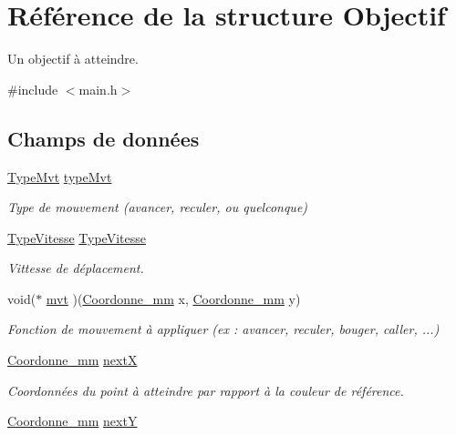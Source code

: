 \hypertarget{struct_objectif}{\section{Référence de la structure Objectif}
\label{struct_objectif}
}


Un objectif à atteindre.  




{\ttfamily \#include $<$main.\+h$>$}

\subsection*{Champs de données}
\begin{DoxyCompactItemize}
\item 
\hyperlink{main_8h_a56ce322c42cf3d49f192527547fa66e8}{Type\+Mvt} \hyperlink{struct_objectif_a4218bcb4ee981dd69d5bfd59ab0804e2}{type\+Mvt}
\begin{DoxyCompactList}\small\item\em Type de mouvement (avancer, reculer, ou quelconque) \end{DoxyCompactList}\item 
\hyperlink{main_8h_a521a835d7ce483bf46cb72d6466e5df1}{Type\+Vitesse} \hyperlink{struct_objectif_acbd7353e97f08e474866c500e2439203}{Type\+Vitesse}
\begin{DoxyCompactList}\small\item\em Vittesse de déplacement. \end{DoxyCompactList}\item 
void($\ast$ \hyperlink{struct_objectif_abcc900b2a2f79b8ba4e543540e48378b}{mvt} )(\hyperlink{main_8h_abff5a495dd3bf48b57d041dce0cf6e68}{Coordonne\+\_\+mm} x, \hyperlink{main_8h_abff5a495dd3bf48b57d041dce0cf6e68}{Coordonne\+\_\+mm} y)
\begin{DoxyCompactList}\small\item\em Fonction de mouvement à appliquer (ex \+: avancer, reculer, bouger, caller, ...) \end{DoxyCompactList}\item 
\hyperlink{main_8h_abff5a495dd3bf48b57d041dce0cf6e68}{Coordonne\+\_\+mm} \hyperlink{struct_objectif_a5f29b0da361761fa2fa8536d5dca2107}{next\+X}
\begin{DoxyCompactList}\small\item\em Coordonnées du point à atteindre par rapport à la couleur de référence. \end{DoxyCompactList}\item 
\hyperlink{main_8h_abff5a495dd3bf48b57d041dce0cf6e68}{Coordonne\+\_\+mm} \hyperlink{struct_objectif_ae9d876c940417db8594ad8edc03b2aa6}{next\+Y}
\end{DoxyCompactItemize}


